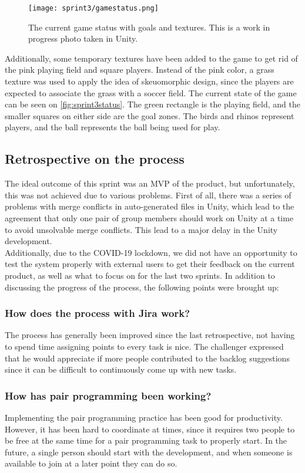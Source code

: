 \begin{figure}[H]
	\centering
	\texttt{[image: sprint3/gamestatus.png]}
	\caption{The current game status with goals and textures. This is a work in progress photo taken in Unity.}
	\label{fig:sprint3status}
\end{figure}
\noindent
Additionally, some temporary textures have been added to the game to get rid of the pink playing field and square players.
Instead of the pink color, a grass texture was used to apply the idea of skeuomorphic design, since the players are expected to associate the grass with a soccer field.
The current state of the game can be seen on \autoref{fig:sprint3status}.
The green rectangle is the playing field, and the smaller squares on either side are the goal zones. 
The birds and rhinos represent players, and the ball represents the ball being used for play.

\subsection{Retrospective on the process}
The ideal outcome of this sprint was an MVP of the product, but unfortunately, this was not achieved due to various problems.
First of all, there was a series of problems with merge conflicts in auto-generated files in Unity, which lead to the agreement that only one pair of group members should work on Unity at a time to avoid unsolvable merge conflicts.
This lead to a major delay in the Unity development.\\
Additionally, due to the COVID-19 lockdown, we did not have an opportunity to test the system properly with external users to get their feedback on the current product, as well as what to focus on for the last two sprints.
In addition to discussing the progress of the process, the following points were brought up:

\subsubsection*{How does the process with Jira work?}
The process has generally been improved since the last retrospective, not having to spend time assigning points to every task is nice.
The challenger expressed that he would appreciate if more people contributed to the backlog suggestions since it can be difficult to continuously come up with new tasks.


\subsubsection*{How has pair programming been working?}
Implementing the pair programming practice has been good for productivity.
However, it has been hard to coordinate at times, since it requires two people to be free at the same time for a pair programming task to properly start.
In the future, a single person should start with the development, and when someone is available to join at a later point they can do so.

